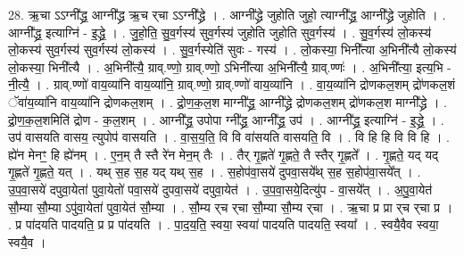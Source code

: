 \documentclass[17pt]{extarticle}
\begin{document}
28. ऋ॒चा ऽऽग्नी᳚द्ध्र॒ आग्नी᳚द्ध्र ऋ॒च र्‌चा ऽऽग्नी᳚द्ध्रे । . आग्नी᳚द्ध्रे जुहोति जुहो॒ त्याग्नी᳚द्ध्र॒ आग्नी᳚द्ध्रे जुहोति । . आग्नी᳚द्ध्र॒ इत्याग्नि॑ - इ॒द्ध्रे॒ । . जु॒हो॒ति॒ सु॒व॒र्गस्य॑ सुव॒र्गस्य॑ जुहोति जुहोति सुव॒र्गस्य॑ । . सु॒व॒र्गस्य॑ लो॒कस्य॑ लो॒कस्य॑ सुव॒र्गस्य॑ सुव॒र्गस्य॑ लो॒कस्य॑ । . सु॒व॒र्गस्येति॑ सुवः - गस्य॑ । . लो॒कस्या॒ भिनी᳚त्या अ॒भिनी᳚त्यै लो॒कस्य॑ लो॒कस्या॒ भिनी᳚त्यै । . अ॒भिनी᳚त्यै॒ ग्राव्.ण्णो॒ ग्राव्.ण्णो॒ ऽभिनी᳚त्या अ॒भिनी᳚त्यै॒ ग्राव्.ण्णः॑ । . अ॒भिनी᳚त्या॒ इत्य॒भि - नी॒त्यै॒ । . ग्राव्.ण्णो॑ वाय॒व्या॑नि वाय॒व्या॑नि॒ ग्राव्.ण्णो॒ ग्राव्.ण्णो॑ वाय॒व्या॑नि । . वा॒य॒व्या॑नि द्रोणकल॒शम् द्रो॑णकल॒शं ॅवा॑य॒व्या॑नि वाय॒व्या॑नि द्रोणकल॒शम् । . द्रो॒ण॒क॒ल॒श माग्नी᳚द्ध्र॒ आग्नी᳚द्ध्रे द्रोणकल॒शम् द्रो॑णकल॒श माग्नी᳚द्ध्रे । . द्रो॒ण॒क॒ल॒शमिति॑ द्रोण - क॒ल॒शम् । . आग्नी᳚द्ध्र॒ उपोपा ग्नी᳚द्ध्र॒ आग्नी᳚द्ध्र॒ उप॑ । . आग्नी᳚द्ध्र॒ इत्याग्नि॑ - इ॒द्ध्रे॒ । . उप॑ वासयति वासय॒ त्युपोप॑ वासयति । . वा॒स॒य॒ति॒ वि वि वा॑सयति वासयति॒ वि । . वि हि हि वि वि हि । . ह्ये॑न मेनꣳ॒॒ हि ह्ये॑नम् । . ए॒न॒म् तै स्तै रे॑न मेन॒म् तैः । . तैर् गृ॒ह्णते॑ गृ॒ह्णते॒ तै स्तैर् गृ॒ह्णते᳚ । . गृ॒ह्णते॒ यद् यद् गृ॒ह्णते॑ गृ॒ह्णते॒ यत् । . यथ् स॒ह स॒ह यद् यथ् स॒ह । . स॒होप॑वा॒सये॑ दुपवा॒सये᳚थ् स॒ह स॒होप॑वा॒सये᳚त् । . उ॒प॒वा॒सये॑ दपुवा॒येता॑ पुवा॒येतो॑ पवा॒सये॑ दुपवा॒सये॑ दपुवा॒येत॑ । . उ॒प॒वा॒सये॒दित्यु॑प - वा॒सये᳚त् । . अ॒पु॒वा॒येत॑ सौ॒म्या सौ॒म्या ऽपु॑वा॒येता॑ पुवा॒येत॑ सौ॒म्या । . सौ॒म्य र्‌च र्‌चा सौ॒म्या सौ॒म्य र्‌चा । . ऋ॒चा प्र प्रा र्‌च र्‌चा प्र । . प्र पा॑दयति पादयति॒ प्र प्र पा॑दयति । . पा॒द॒य॒ति॒ स्वया॒ स्वया॑ पादयति पादयति॒ स्वया᳚ । . स्वयै॒वैव स्वया॒ स्वयै॒व । \newline
\end{document}
